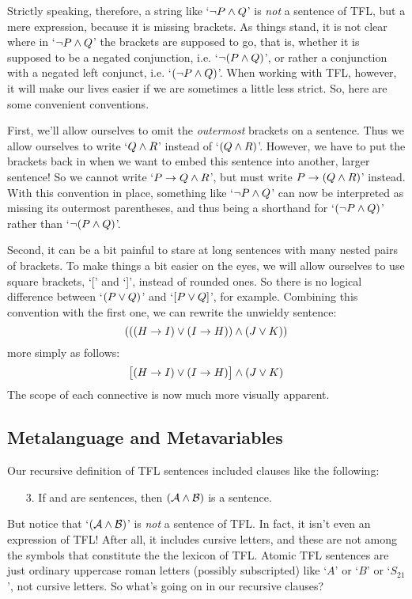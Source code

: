 Strictly speaking, therefore, a string like `$\neg P \wedge Q$' is \emph{not} a sentence of TFL, but a mere expression, because it is missing brackets.  As things stand, it is not clear where in `$\neg P \wedge Q$' the brackets are supposed to go, that is, whether it is supposed to be a negated conjunction, i.e. `$\neg (P \wedge Q)$', or rather a conjunction with a negated left conjunct, i.e.  `$(\neg P \wedge Q)$'.  When working with TFL, however, it will make our lives easier if we are sometimes a little less strict. So, here are some convenient conventions.

First,  we'll allow ourselves to omit the \emph{outermost} brackets on a sentence. Thus we allow ourselves to write `$Q \wedge R$' instead of `$(Q \wedge R)$'. However, we have to put the brackets back in when we want to embed this sentence into another, larger sentence!  So we cannot write `$P \rightarrow Q \wedge R$', but must write $P \rightarrow (Q \wedge R)$' instead.  With this convention in place, something like `$\neg P \wedge Q$' can now be interpreted as missing its outermost parentheses, and thus being a shorthand for `$(\neg P \wedge Q)$' rather than `$\neg (P \wedge Q)$'.

Second, it can be a bit painful to stare at long sentences with many nested pairs of brackets. To make things a bit easier on the eyes, we will allow ourselves to use square brackets, `[' and `]', instead of rounded ones. So there is no logical difference between `$(P\vee Q)$' and `$[P\vee Q]$', for example. Combining this convention with the first one, we can rewrite the unwieldy sentence:
$$(((H \rightarrow I) \vee (I \rightarrow H)) \wedge (J \vee K))$$
more simply as follows:
$$\bigl[(H \rightarrow I) \vee (I \rightarrow H)\bigr] \wedge (J \vee K)$$
The scope of each connective is now much more visually apparent.

\subsection{Metalanguage and Metavariables}\label{s:TFLMetavariables}

Our recursive definition of TFL sentences included clauses like the following:
\begin{enumerate}
\item[3.] If  and  are sentences, then $(\mathcal{A}\wedge\mathcal{B})$ is a sentence.
\end{enumerate}
But notice that `$(\mathcal{A} \wedge \mathcal{B})$' is \emph{not} a sentence of TFL.  In fact, it isn't even an expression of TFL!  After all, it includes cursive letters, and these are not among the symbols that constitute the the lexicon of TFL.  Atomic TFL sentences are just ordinary uppercase roman letters (possibly subscripted) like `$A$' or `$B$' or `$S_{21}$', not cursive letters.  So what's going on in our recursive clauses?

